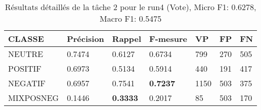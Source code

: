 \begin{table}
\begin{tabular}{l|l|l|l|l|l|l}
  CLASSE	&Précision	&Rappel	&F-mesure	&VP	&FP	&FN\\
\hline
  NEUTRE	&0.7474	&0.6127	&0.6734	&799	&270	&505\\
  POSITIF	&0.6973	&0.5134	&0.5914	&440	&191	&417\\
  NEGATIF	&0.6957	&0.7541	&\textbf{0.7237}	&1150	&503	&375\\
  MIXPOSNEG	&0.1446	&\textbf{0.3333}	&0.2017	&85	&503	&170\\
\hline
\end{tabular}
\caption{Résultats détaillés de la tâche 2 pour le run4 (Vote),
  Micro F1: 0.6278, Macro F1: 0.5475\label{tab:detail4}}
\end{table}
